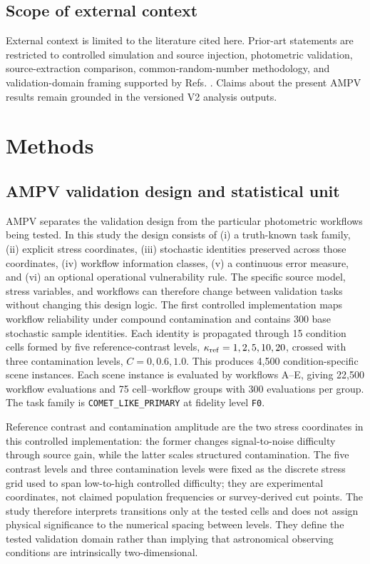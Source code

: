 \subsection{Scope of external context}\label{scope-of-external-context}

External context is limited to the literature cited here.
Prior-art statements are restricted to controlled simulation and source
injection, photometric validation, source-extraction comparison,
common-random-number methodology, and validation-domain framing
supported by Refs.
\cite{ref1,ref2,ref3,ref4,ref5,ref6,ref7,ref8,ref9,ref10,ref11}. Claims about
the present AMPV results remain grounded in the versioned V2 analysis
outputs.

\section{Methods}\label{methods}

\subsection{AMPV validation design and statistical
unit}\label{ampv-validation-design-and-statistical-unit}

AMPV separates the validation design from the particular photometric
workflows being tested. In this study the design consists of (i) a
truth-known task family, (ii) explicit stress coordinates, (iii)
stochastic identities preserved across those coordinates, (iv)
workflow information classes, (v) a continuous error measure, and (vi)
an optional operational vulnerability rule. The specific source model,
stress variables, and workflows can therefore change between validation
tasks without changing this design logic. The first controlled
implementation maps workflow reliability under compound contamination
and contains 300 base stochastic sample identities. Each identity is propagated through 15 condition cells
formed by five reference-contrast levels,
\(\kappa_{\rm ref}=1,2,5,10,20\), crossed with three contamination
levels, \(C=0,0.6,1.0\). This produces 4,500 condition-specific scene
instances. Each scene instance is evaluated by workflows A--E, giving
22,500 workflow evaluations and 75 cell--workflow groups with 300
evaluations per group. The task family is \texttt{COMET\_LIKE\_PRIMARY}
at fidelity level \texttt{F0}.

Reference contrast and contamination amplitude are the two stress coordinates in this controlled implementation: the former changes signal-to-noise difficulty through source gain, while the latter scales structured contamination. The five contrast levels and three contamination levels were fixed as the discrete stress grid used to span low-to-high controlled difficulty; they are experimental coordinates, not claimed population frequencies or survey-derived cut points. The study therefore interprets transitions only at the tested cells and does not assign physical significance to the numerical spacing between levels. They define the tested validation domain rather than implying that astronomical observing conditions are intrinsically two-dimensional.

